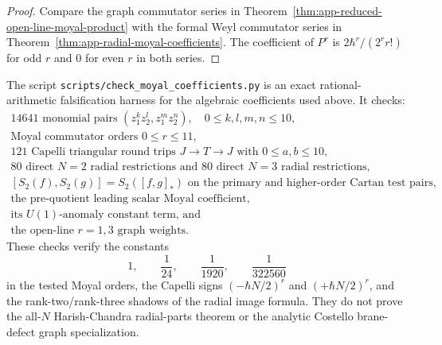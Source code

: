 \begin{proof}
  Compare the graph commutator series in
  Theorem~\ref{thm:app-reduced-open-line-moyal-product} with the formal
  Weyl commutator series in
  Theorem~\ref{thm:app-radial-moyal-coefficients}.  The coefficient of
  \(P^r\) is \(2\hbar^r/(2^r r!)\) for odd \(r\) and \(0\) for even
  \(r\) in both series.
\end{proof}

\begin{rmk}
\label{rmk:app-radial-finite-verification}
  The script \texttt{scripts/check\_moyal\_coefficients.py} is an
  exact rational-arithmetic falsification harness for the algebraic
  coefficients used above.  It checks:
  \[
  \begin{gathered}
    14641\text{ monomial pairs }(z_1^kz_2^l,z_1^mz_2^n),
      \quad 0\leq k,l,m,n\leq10,\\
    \text{Moyal commutator orders }0\leq r\leq11,\\
    121\text{ Capelli triangular round trips }J\to T\to J
      \text{ with }0\leq a,b\leq10,\\
    80\text{ direct }N=2\text{ radial restrictions and }
      80\text{ direct }N=3\text{ radial restrictions},\\
    [S_2(f),S_2(g)]=S_2([f,g]_{*})
      \text{ on the primary and higher-order Cartan test pairs},\\
    \text{the pre-quotient leading scalar Moyal coefficient,}\\
    \text{its \(U(1)\)-anomaly constant term, and}\\
    \text{the open-line }r=1,3\text{ graph weights.}
  \end{gathered}
  \]
  These checks verify the constants
  \[
    1,\qquad \frac1{24},\qquad
    \frac1{1920},\qquad \frac1{322560}
  \]
  in the tested Moyal orders, the Capelli signs
  \((-\hbar N/2)^r\) and \((+\hbar N/2)^r\), and the rank-two/rank-three
  shadows of the radial image formula.  They do not prove the
  all-\(N\) Harish-Chandra radial-parts theorem or the analytic
  Costello brane-defect graph specialization.


\end{rmk}

